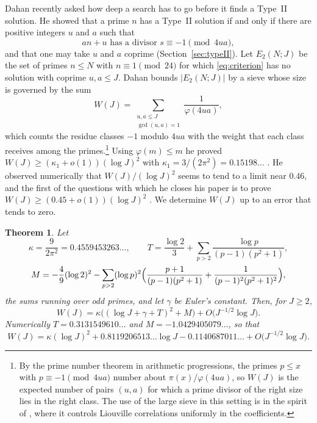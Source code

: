 \documentclass{amsart}
\newtheorem{theorem}{Theorem}[section]
\theoremstyle{definition}
\theoremstyle{remark}
\numberwithin{equation}{section}
\begin{document}
Dahan \cite{Dah} recently asked how deep a search has to go before it finds a Type~II solution. He showed that a prime $n$ has a Type~II solution if and only if there are positive integers $u$ and $a$ such that
\begin{equation}\label{eq:criterion}
an+u \text{ has a divisor } s\equiv-1\pmod{4ua},
\end{equation}
and that one may take $u$ and $a$ coprime (Section~\ref{sec:typeII}). Let $E_2(N;J)$ be the set of primes $n\le N$ with $n\equiv1\pmod{24}$ for which \eqref{eq:criterion} has no solution with coprime $u,a\le J$. Dahan bounds $|E_2(N;J)|$ by a sieve whose size is governed by the sum
\begin{equation}\label{eq:W}
W(J)=\sum_{\substack{u,a\le J\\ \gcd(u,a)=1}}\frac1{\varphi(4ua)},
\end{equation}
which counts the residue classes $-1$ modulo $4ua$ with the weight that each class receives among the primes.\footnote{By the prime number theorem in arithmetic progressions, the primes $p\le x$ with $p\equiv-1\pmod{4ua}$ number about $\pi(x)/\varphi(4ua)$, so $W(J)$ is the expected number of pairs $(u,a)$ for which a prime divisor of the right size lies in the right class. The use of the large sieve in this setting is in the spirit of \cite{BB26}, where it controls Liouville correlations uniformly in the coefficients.} Using $\varphi(m)\le m$ he proved $W(J)\ge(\kappa_1+o(1))(\log J)^2$ with $\kappa_1=3/(2\pi^2)=0.15198\ldots$ \cite[Lemma~4.22]{Dah}. He observed numerically that $W(J)/(\log J)^2$ seems to tend to a limit near $0.46$, and the first of the questions with which he closes his paper is to prove $W(J)\ge(0.45+o(1))(\log J)^2$ \cite[Section~7]{Dah}. We determine $W(J)$ up to an error that tends to zero.

\begin{theorem}\label{thm:main}
Let
\[
\kappa=\frac9{2\pi^2}=0.4559453263\ldots,\qquad T=\frac{\log2}3+\sum_{p>2}\frac{\log p}{(p-1)(p^2+1)},
\]
\[
M=-\frac49(\log2)^2-\sum_{p>2}(\log p)^2\Bigl(\frac{p+1}{(p-1)(p^2+1)}+\frac1{(p-1)^2(p^2+1)^2}\Bigr),
\]
the sums running over odd primes, and let $\gamma$ be Euler's constant. Then, for $J\ge2$,
\[
W(J)=\kappa\bigl((\log J+\gamma+T)^2+M\bigr)+O\bigl(J^{-1/2}\log J\bigr).
\]
Numerically $T=0.3131549610\ldots$ and $M=-1.0429405079\ldots$, so that
\[
W(J)=\kappa(\log J)^2+0.8119206513\ldots\log J-0.1140687011\ldots+O\bigl(J^{-1/2}\log J\bigr).
\]
\end{theorem}
\end{document}

